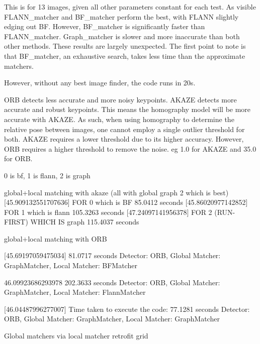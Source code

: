     
    This is for 13 images, given all other parameters constant for each test. As visible FLANN\_matcher and BF\_matcher perform the best, with FLANN slightly edging out BF. However, BF\_matcher is significantly faster than FLANN\_matcher. Graph\_matcher is slower and more inaccurate than both other methods. 
    These results are largely unexpected. The first point to note is that BF\_matcher, an exhaustive search, takes less time than the approximate matchers. 

    However, without any best image finder, the code runs in 20s.       





ORB detects less accurate and more noisy keypoints. AKAZE detects more accurate and robust keypoints. This means the homography model will be more accurate with AKAZE. As such, when using homography to determine the relative pose between images, one cannot employ a single outlier threshold for both. AKAZE requires a lower threshold due to its higher accuracy. However, ORB requires a higher threshold to remove the noise.
eg 1.0 for AKAZE and 35.0 for ORB. 




0 is bf, 1 is flann, 2 is graph

global+local matching with akaze (all with global graph 2 which is best)
[45.909132551707636] FOR 0 which is BF 85.0412 seconds
[45.86020977142852] FOR 1 which is flann 105.3263 seconds
[47.24097141956378] FOR 2 (RUN-FIRST) WHICH IS graph 115.4037 seconds


global+local matching with ORB

[45.69197059475034] 81.0717 seconds Detector: ORB, Global Matcher: GraphMatcher, Local Matcher: BFMatcher

46.09923686293978 202.3633 seconds Detector: ORB, Global Matcher: GraphMatcher, Local Matcher: FlannMatcher  

[46.04487996277007] Time taken to execute the code: 77.1281 seconds Detector: ORB, Global Matcher: GraphMatcher, Local Matcher: GraphMatcher


Global matchers via local matcher retrofit grid

